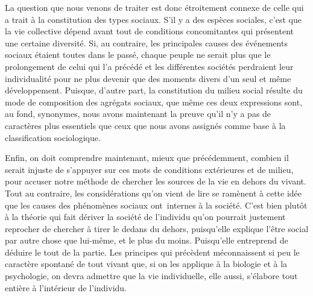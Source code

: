 \documentclass[french,twoside]{book} %
\begin{document}
La question que nous venons de traiter est donc étroitement connexe de celle qui a trait à la constitution des types sociaux. S’il y a des espèces sociales, c’est que la vie collective dépend avant tout de conditions concomitantes qui présentent une certaine diversité. Si, au contraire, les principales causes des événements sociaux étaient toutes dans le passé, chaque peuple ne serait plus que le prolongement de celui qui l’a précédé et les différentes sociétés perdraient leur individualité pour ne plus devenir que des moments divers d’un seul et même développement. Puisque, d’autre part, la constitution du milieu social résulte du mode de composition des agrégats sociaux, que même ces deux expressions sont, au fond, synonymes, nous avons maintenant la preuve qu’il n’y a pas de caractères plus essentiels que ceux que nous avons assignés comme base à la classification sociologique.\par
Enfin, on doit comprendre maintenant, mieux que précédemment, combien il serait injuste de s’appuyer sur ces mots de conditions extérieures et de milieu, pour accuser notre méthode de chercher les sources de la vie en dehors du vivant. Tout au contraire, les considérations qu’on vient de lire se ramènent à cette idée que les causes des phénomènes sociaux ont internes à la société. C’est bien plutôt à la théorie qui fait dériver la société de l’individu qu’on pourrait justement reprocher de chercher à tirer le dedans du dehors, puisqu’elle explique l’être social par autre chose que lui-même, et le plus du moins. Puisqu’elle entreprend de déduire le tout de la partie. Les principes qui précèdent méconnaissent si peu le caractère spontané de tout vivant que, si on les applique à la biologie et à la psychologie, on devra admettre que la vie individuelle, elle aussi, s’élabore tout entière à l’intérieur de l’individu.
\end{document}
